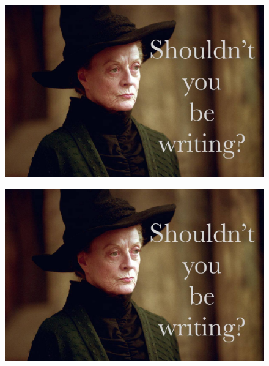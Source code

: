 \begin{figure}[!htb]
    \centering
    \includegraphics[width=\textwidth]{figures/placeholder.jpg}
    \caption[Nightside Poloidal and Toroidal Energy]{
      \todo{$\cdots$}
    }
    \label{fig_U_night}
\end{figure}


\begin{figure}[!htb]
    \centering
    \includegraphics[width=\textwidth]{figures/placeholder.jpg}
    \caption[Nightside Poloidal Energy Distribution]{
      \todo{$\cdots$}
    }
    \label{fig_layers_night_p}
\end{figure}

